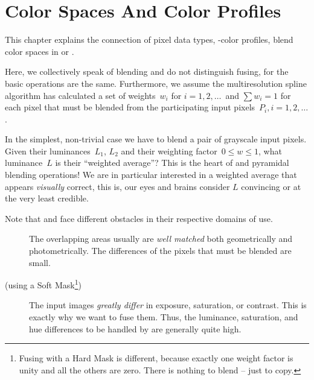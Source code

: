 

\chapter[Color Spaces\commonpart]{\label{sec:color-spaces}%
  Color Spaces And Color Profiles\commonpart}

This chapter explains the connection of pixel data types,
-color profiles,
 blend color spaces in
 or .

Here, we collectively speak of blending and do not distinguish fusing, for the basic operations are the same.  Furthermore, we assume the
multiresolution spline algorithm has calculated a set of weights~$w_i$ for $i = 1, 2, \dots$~and
$\sum w_i = 1$ for each pixel that must be blended from the participating input
pixels~$P_i, i = 1, 2, \dots$.

In the simplest, non-trivial case we have to blend a pair of grayscale input pixels.  Given
their luminances~$L_1$, $L_2$ and their weighting
factor~$0 \leq w \leq 1$, what luminance~$L$ is their ``weighted average''?
This is the heart of  and  pyramidal blending
operations!  We are in particular interested in a weighted average that appears \emph{visually}
correct, this is, our eyes and brains consider $L$ convincing or at the very least credible.

\begin{geeknote}
  \noindent Note that  and  face different obstacles in
  their respective domains of use.

  \begin{description}
  \item[]\itemend
    The overlapping areas usually are \emph{well matched} both geometrically and
    photometrically.  The differences of the pixels that must be blended are small.

  \item[ (using a Soft Mask\footnote{Fusing with a Hard Mask is different,
      because exactly one weight factor is unity and all the others are zero.  There is nothing
      to blend -- just to copy.})]\itemend
    The input images \emph{greatly differ} in exposure, saturation, or contrast.  This is
    exactly why we want to fuse them.  Thus, the luminance, saturation, and hue differences to
    be handled by  are generally quite high.
  \end{description}
\end{geeknote}

